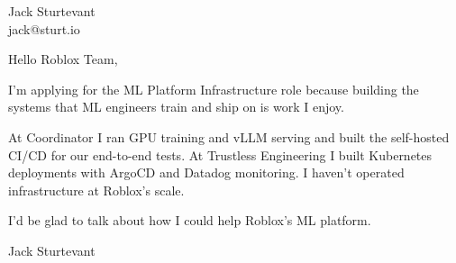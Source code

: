 \documentclass[11pt]{article}
\begin{document}
\raggedright

{\namefont\fontsize{20pt}{24pt}\selectfont Jack Sturtevant}\\[-0.3em]
jack@sturt.io

\vspace{1.2em}

Hello Roblox Team,

I'm applying for the ML Platform Infrastructure role because building the systems that ML engineers train and ship on is work I enjoy.

At Coordinator I ran GPU training and vLLM serving and built the self-hosted CI/CD for our end-to-end tests. At Trustless Engineering I built Kubernetes deployments with ArgoCD and Datadog monitoring. I haven't operated infrastructure at Roblox's scale.

I'd be glad to talk about how I could help Roblox's ML platform.

\vspace{0.6em}
Jack Sturtevant
\end{document}
